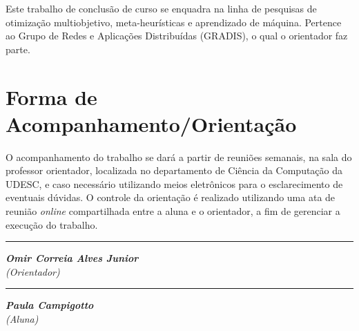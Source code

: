 \documentclass[11pt]{article}
\begin{document}
    Este trabalho de conclusão de curso se enquadra na linha de pesquisas de otimização multiobjetivo, meta-heurísticas e aprendizado de máquina. Pertence ao Grupo de Redes e Aplicações Distribuídas (GRADIS), o qual o orientador faz parte.

\section{Forma de Acompanhamento/Orientação}

    O acompanhamento do trabalho se dará a partir de reuniões semanais, na sala do professor orientador, localizada no departamento de Ciência da Computação da UDESC, e caso necessário utilizando meios eletrônicos para o esclarecimento de eventuais dúvidas. O controle da orientação é realizado utilizando uma ata de reunião \textit{online} compartilhada entre a aluna e o orientador, a fim de gerenciar a execução do trabalho.



% 

\nocite{cefet, Moreira2018, Castilho2019, Kolm2014, CoelloCoello2006, ashwood, Jaszkiewicz2002, freitas2003, Mansini2015, Araujo2015, Maindonald2009}


\vskip 5cm

\begin{minipage} {0.49\linewidth}
  \centering
  \rule{7.2cm}{0.1mm}

  \textbf{\textit{Omir Correia Alves Junior}}\\
  \textit{(Orientador)}
\end{minipage}
\begin{minipage} {0.49\linewidth}
  \centering
  \rule{7.2cm}{0.1mm}

  \textbf{\textit{Paula Campigotto}}\\
  \textit{(Aluna)}
\end{minipage}

\vskip 1.0cm
\end{document}
